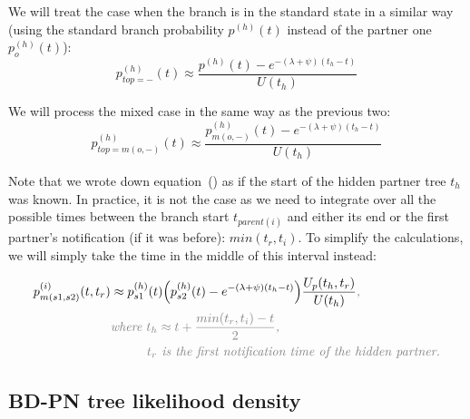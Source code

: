 \documentclass[a4paper,10pt]{article}
\begin{document}
We will treat the case when the branch is in the standard state in a similar way (using the standard branch probability $p^{(h)}(t)$ instead of the partner one $p_o^{(h)}(t)$):
\begin{equation}
p_{top=-}^{(h)}(t) \approx \frac{p^{(h)}(t) -e^{-(\lambda + \psi)(t_{h} - t)}}{U(t_{h})}
\end{equation}

We will process the mixed case in the same way as the previous two:
\begin{equation}
p_{top=m(o,-)}^{(h)}(t) \approx \frac{p_{m(o,-)}^{(h)}(t) -e^{-(\lambda + \psi)(t_{h} - t)}}{U(t_{h})}
\end{equation}

Note that we wrote down equation~(\label{eq:mixed}) as if the start of the hidden partner tree $t_h$ was known. In practice, it is not the case as we need to integrate over all the possible times between the branch start $t_{parent(i)}$ and either its end or the first partner's notification (if it was before): $min(t_r,t_i)$. To simplify the calculations, we will simply take the time in the middle of this interval instead: 

\begin{equation}
\begin{split}
p_{m(s1,s2)}^{(i)}(t,t_r) &\approx p_{s1}^{(h)}(t)\Big(p_{s2}^{(h)}(t) -e^{-(\lambda + \psi)(t_{h} - t)}\Big)\frac{U_p(t_h,t_r)}{U(t_{h})}\textit{\color{gray},}\\
&\textit{\color{gray}where $t_h \approx t + \frac{min(t_r, t_i) - t}{2}$,}\\
&\textit{\color{gray}~~~~~~~~$t_r$ is the first notification time of the hidden partner.}\\
\end{split}\label{eq:p_mixed}
\end{equation}




\subsection{BD-PN tree likelihood density} 
\end{document}
